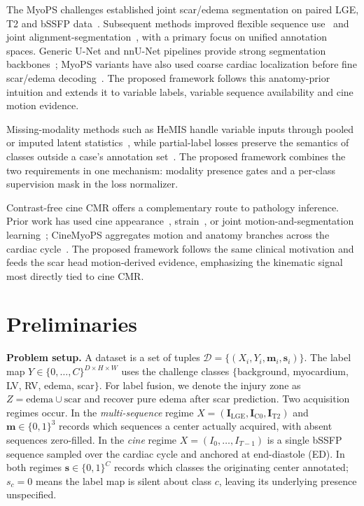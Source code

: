 \documentclass[runningheads]{llncs}
\newcommand{\LGE}{\mathrm{LGE}}
\newcommand{\Cz}{\mathrm{C0}}
\newcommand{\TT}{\mathrm{T2}}
\newcommand{\Img}{\mathbf{I}}
\begin{document}
The MyoPS challenges established joint scar/edema segmentation on paired LGE,
T2 and bSSFP data~\cite{zhuang2019multivariate,li2023myops}. Subsequent methods
improved flexible sequence use~\cite{qiu2023myopsnet} and joint
alignment-segmentation~\cite{ding2023aligning}, with a primary focus on unified
annotation spaces. Generic U-Net and nnU-Net pipelines provide strong
segmentation backbones~\cite{ronneberger2015unet,isensee2021nnunet}; MyoPS
variants have also used coarse cardiac localization before fine scar/edema
decoding~\cite{zhai2020coarsemyops,wang2022awsnet}. The proposed framework
follows this anatomy-prior intuition and extends it to variable labels, variable
sequence availability and cine motion evidence.

Missing-modality methods such as HeMIS handle variable inputs through pooled or
imputed latent statistics~\cite{havaei2016hemis,dorent2019hetero}, while
partial-label losses preserve the semantics of classes outside a case's
annotation set~\cite{shi2021marginal,zhou2019priorpartial,fidon2021labelsetloss}.
The proposed framework combines the two requirements in one mechanism:
modality presence gates and a per-class supervision mask in the loss normalizer.

Contrast-free cine CMR offers a complementary route to pathology inference.
Prior work has used cine appearance~\cite{zhang2019deeplearningcine},
strain~\cite{scatteia2017strain,%
morales2021deepstrain}, or joint motion-and-segmentation
learning~\cite{qin2018jointmotion}; CineMyoPS aggregates motion and anatomy
branches across the cardiac cycle~\cite{ding2025cinemyops}. The proposed
framework follows the same clinical motivation and feeds the scar head
motion-derived evidence, emphasizing the kinematic signal most directly tied to
cine CMR.

\section{Preliminaries}

\noindent\textbf{Problem setup.} A dataset is a set of tuples
$\mathcal{D}=\{(X_i, Y_i, \mathbf{m}_i, \mathbf{s}_i)\}$. The label map
$Y \in \{0,\dots,C\}^{D\times H\times W}$ uses the challenge classes
$\{$background, myocardium, LV, RV, edema, scar$\}$. For label fusion, we denote
the injury zone as $Z=\text{edema}\cup\text{scar}$ and recover pure edema after
scar prediction. Two acquisition regimes occur. In the
\emph{multi-sequence} regime $X=(\Img_\LGE,\Img_\Cz,\Img_\TT)$ and
$\mathbf{m}\in\{0,1\}^3$ records which sequences a center actually acquired,
with absent sequences zero-filled. In the \emph{cine} regime
$X=(I_0,\dots,I_{T-1})$ is a single bSSFP sequence sampled over the cardiac
cycle and anchored at end-diastole (ED). In both regimes
$\mathbf{s}\in\{0,1\}^{C}$ records which classes the originating center
annotated; $s_c=0$ means the label map is silent about class $c$, leaving its
underlying presence unspecified.
\end{document}
